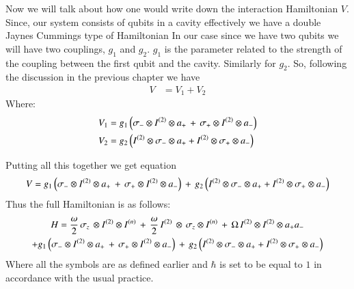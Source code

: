 Now we will talk about how one would write down the interaction Hamiltonian $V$. Since, our system consists of qubits in a cavity effectively we have a double Jaynes Cummings type of Hamiltonian 
In our case since we have two qubits  we will have two couplings, \(g_{1}\) and \(g_{2}\). ${g}_{1}$ is the parameter related to the  strength of the coupling between the first qubit and the cavity. Similarly for ${g}_{2}$. So, following the discussion in the previous chapter we have 
\begin{align}\label{eq:15.1}
V &= V_{1} + V_{2}
\end{align}
Where: 
\begin{align}\label{eq 15.2}
V_{1}&= g_{1}\left({\sigma  }_{ - }\otimes I^{(2)}\otimes { a }_{ + }\thinspace + \thinspace{ \sigma }_{+}\otimes I^{(2)}\otimes{a}_{ - }\right)\\
V_{2}&= g_{ 2 }\left(I^{(2)}\otimes { \sigma  }_{ - }\otimes { a }_{ + }+I^{(2)}\otimes { \sigma  }_{ + }\otimes { a }_{ - }\right)
\end{align}



Putting all this together we get equation 
\begin{equation}\label{eq:16}
V= g_{1}\left({\sigma  }_{ - }\otimes I^{(2)}\otimes { a }_{ + }\thinspace + \thinspace{ \sigma }_{+}\otimes I^{(2)}\otimes{a}_{ - }\right)\thinspace
+\thinspace g_{ 2 }\left(I^{(2)}\otimes { \sigma  }_{ - }\otimes { a }_{ + }+I^{(2)}\otimes { \sigma  }_{ + }\otimes { a }_{ - }\right)
\end{equation}
Thus the full Hamiltonian is as follows:
\begin{multline}\label{FullH:1}
H =\frac{\omega}{2}\thinspace{\sigma}_{z}\thinspace\otimes I^{(2)}\otimes{I^{(n)}}\thinspace +\thinspace\frac{\omega}{2}\thinspace{I^{(2)}}\thinspace\otimes\thinspace{\sigma}_{z}\otimes{I^{(n)}}\thinspace+\thinspace\Omega\thinspace I^{(2)}\otimes I^{(2)}\otimes{a}_{+}{a}_{- } \\
+ g_{1}\left({\sigma  }_{ - }\otimes I^{(2)}\otimes { a }_{ + }\thinspace + \thinspace{ \sigma }_{+}\otimes I^{(2)}\otimes{a}_{ - }\right)\thinspace
+\thinspace g_{ 2 }\left(I^{(2)}\otimes { \sigma  }_{ - }\otimes { a }_{ + }+I^{(2)}\otimes { \sigma  }_{ + }\otimes { a }_{ - }\right)
\end{multline}
Where all the symbols are as defined earlier and $\hbar$ is set to be equal to $1$ in accordance with the usual practice.  
